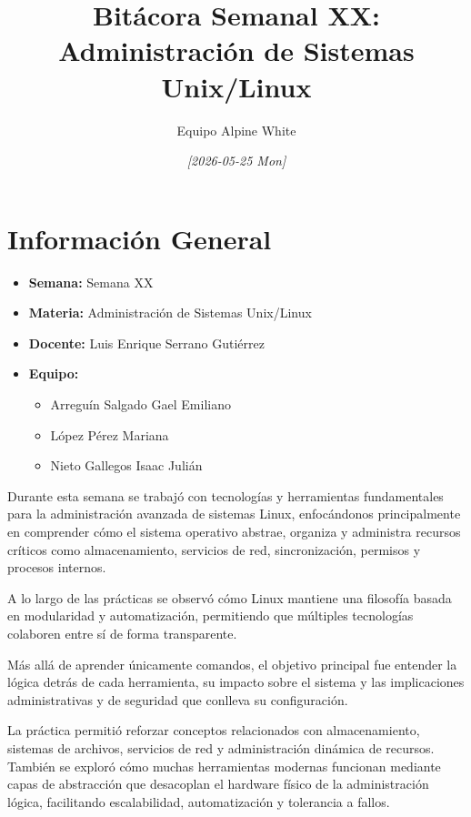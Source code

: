 \documentclass[11pt, letterpaper]{article}
\author{Equipo Alpine White}
\date{\textit{{[}2026-05-25 Mon]}}
\title{Bitácora Semanal XX: Administración de Sistemas Unix/Linux}
\begin{document}
\maketitle
\setcounter{tocdepth}{2}
\tableofcontents

\section{Información General}
\label{sec:org857ddcd}

\begin{itemize}
\item \textbf{Semana:} Semana XX
\item \textbf{Materia:} Administración de Sistemas Unix/Linux
\item \textbf{Docente:} Luis Enrique Serrano Gutiérrez
\item \textbf{Equipo:}

\begin{itemize}
\item Arreguín Salgado Gael Emiliano
\item López Pérez Mariana
\item Nieto Gallegos Isaac Julián
\end{itemize}
\end{itemize}

Durante esta semana se trabajó con tecnologías y herramientas fundamentales para la administración avanzada de sistemas Linux, enfocándonos principalmente en comprender cómo el sistema operativo abstrae, organiza y administra recursos críticos como almacenamiento, servicios de red, sincronización, permisos y procesos internos.

A lo largo de las prácticas se observó cómo Linux mantiene una filosofía basada en modularidad y automatización, permitiendo que múltiples tecnologías colaboren entre sí de forma transparente.

Más allá de aprender únicamente comandos, el objetivo principal fue entender la lógica detrás de cada herramienta, su impacto sobre el sistema y las implicaciones administrativas y de seguridad que conlleva su configuración.

La práctica permitió reforzar conceptos relacionados con almacenamiento, sistemas de archivos, servicios de red y administración dinámica de recursos. También se exploró cómo muchas herramientas modernas funcionan mediante capas de abstracción que desacoplan el hardware físico de la administración lógica, facilitando escalabilidad, automatización y tolerancia a fallos.
\end{document}
